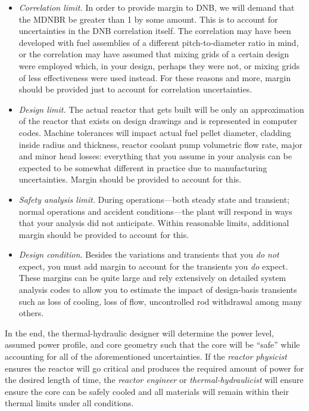 \begin{itemize}
\item \emph{Correlation limit.}  In order to provide margin to DNB, we will demand that the MDNBR be greater than 1 by some amount.  This is to account for uncertainties in the DNB correlation itself.  The correlation may have been developed with fuel assemblies of a different pitch-to-diameter ratio in mind, or the correlation may have assumed that mixing grids of a certain design were employed which, in your design, perhaps they were not, or mixing grids of less effectiveness were used instead.  For these reasons and more, margin should be provided just to account for correlation uncertainties.

\item \emph{Design limit.}  The actual reactor that gets built will be only an approximation of the reactor that exists on design drawings and is represented in computer codes.  Machine tolerances will impact actual fuel pellet diameter, cladding inside radius and thickness, reactor coolant pump volumetric flow rate, major and minor head losses: everything that you assume in your analysis can be expected to be somewhat different in practice due to manufacturing uncertainties.  Margin should be provided to account for this.

\item \emph{Safety analysis limit.}  During operations---both steady state and transient; normal operations and accident conditions---the plant will respond in ways that your analysis did not anticipate.  Within reasonable limits, additional margin should be provided to account for this.  

\item \emph{Design condition.}  Besides the variations and transients that you \emph{do not} expect, you must add margin to account for the transients you \emph{do} expect.  These margins can be quite large and rely extensively on detailed system analysis codes to allow you to estimate the impact of design-basis transients such as loss of cooling, loss of flow, uncontrolled rod withdrawal among many others.  
\end{itemize}

In the end, the thermal-hydraulic designer will determine the power level, assumed power profile, and core geometry such that the core will be ``safe'' while accounting for all of the aforementioned uncertainties.  If the \emph{reactor physicist} ensures the reactor will go critical and produces the required amount of power for the desired length of time, the \emph{reactor engineer} or \emph{thermal-hydraulicist} will ensure ensure the core can be safely cooled and all materials will remain within their thermal limits under all conditions.
  
